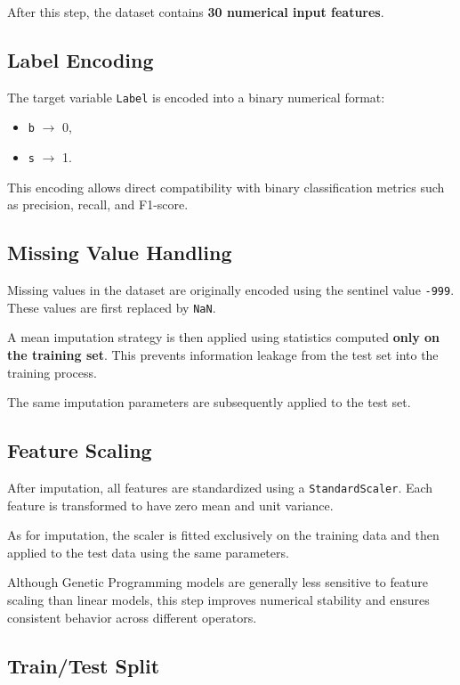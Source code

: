 \documentclass[12pt,a4paper]{article}
\begin{document}
After this step, the dataset contains \textbf{30 numerical input features}.

\subsection{Label Encoding}

The target variable \texttt{Label} is encoded into a binary numerical format:
\begin{itemize}
    \item \texttt{b} $\rightarrow$ 0,
    \item \texttt{s} $\rightarrow$ 1.
\end{itemize}

This encoding allows direct compatibility with binary classification metrics
such as precision, recall, and F1-score.

\subsection{Missing Value Handling}

Missing values in the dataset are originally encoded using the sentinel value
\texttt{-999}. These values are first replaced by \texttt{NaN}.

A mean imputation strategy is then applied using statistics computed
\textbf{only on the training set}. This prevents information leakage from the
test set into the training process.

The same imputation parameters are subsequently applied to the test set.

\subsection{Feature Scaling}

After imputation, all features are standardized using a \texttt{StandardScaler}.
Each feature is transformed to have zero mean and unit variance.

As for imputation, the scaler is fitted exclusively on the training data and then
applied to the test data using the same parameters.

Although Genetic Programming models are generally less sensitive to feature
scaling than linear models, this step improves numerical stability and ensures
consistent behavior across different operators.

\subsection{Train/Test Split}
\end{document}
